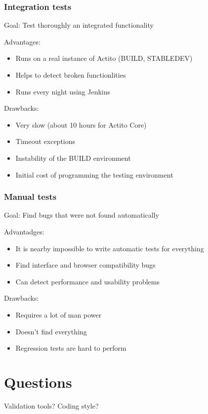\documentclass[a4paper, 11pt]{article}
\begin{document}
    \subsubsection{Integration tests}

    Goal: Test thoroughly an integrated functionality

    Advantages:
    \begin{itemize}
        \item Runs on a real instance of Actito (BUILD, STABLEDEV)
        \item Helps to detect broken functionlities
        \item Runs every night using Jenkins
    \end{itemize}

    Drawbacks:
    \begin{itemize}
        \item Very slow (about 10 hours for Actito Core)
        \item Timeout exceptions
        \item Instability of the BUILD environment
        \item Initial cost of programming the testing environment
    \end{itemize}

    \subsubsection{Manual tests}

    Goal: Find bugs that were not found automatically

    Advantadges:
    \begin{itemize}
        \item It is nearby impossible to write automatic tests for everything
        \item Find interface and browser compatibility bugs
        \item Can detect performance and usability problems
    \end{itemize}

    Drawbacks:
    \begin{itemize}
        \item Requires a lot of man power
        \item Doesn't find everything
        \item Regression tests are hard to perform
    \end{itemize}

    \section{Questions}

    Validation tools? Coding style?
\end{document}
